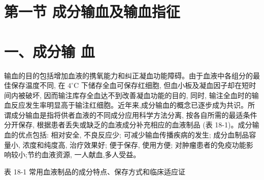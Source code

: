 \documentclass[10pt]{article}
\begin{document}
\section*{第一节 成分输血及输血指征}
\section*{一、成分输 血}
输血的目的包括增加血液的携氧能力和纠正凝血功能障碍。由于血液中各组分的最佳保存温度不同, 在 $4^{\circ} \mathrm{C}$ 下储存全血可保存红细胞, 但血小板及凝血因子却在短时间内被破坏, 因而输注库存全血达不到改善凝血功能的目的, 同时, 输注全血时的输血反应发生率明显高于输注红细胞。近年来,成分输血的概念已逐步成为共识。所谓成分输血是指将供者血液的不同成分应用科学方法分离, 按各自所需的最适条件分开保存, 根据患者丢失或缺乏的血液成分补充相应的血液制品 (表 18-1)。成分输血的优点包括: 相对安全, 不良反应少; 可减少输血传播疾病的发生; 成分血制品容量小, 浓度和纯度高, 治疗效果好; 便于保存, 使用方便; 对肿瘤患者的免疫功能影响较小;节约血液资源, 一人献血,多人受益。

表 18-1 常用血液制品的成分特点、保存方式和临床适应证
\end{document}

